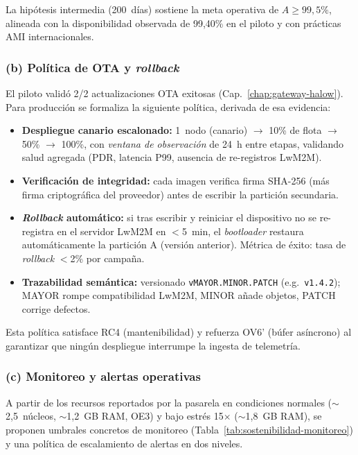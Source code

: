 La hipótesis intermedia (200~días) sostiene la meta operativa de $A \geq 99{,}5\%$, alineada con la disponibilidad observada de 99,40\% en el piloto y con prácticas AMI internacionales.

\subsubsection{(b) Política de OTA y \emph{rollback}}

El piloto validó 2/2 actualizaciones OTA exitosas (Cap.~\ref{chap:gateway-halow}). Para producción se formaliza la siguiente política, derivada de esa evidencia:

\begin{itemize}
\item \textbf{Despliegue canario escalonado:} 1~nodo (canario) $\rightarrow$ 10\% de flota $\rightarrow$ 50\% $\rightarrow$ 100\%, con \emph{ventana de observación} de 24~h entre etapas, validando salud agregada (PDR, latencia P99, ausencia de re-registros LwM2M).
\item \textbf{Verificación de integridad:} cada imagen verifica firma SHA-256 (más firma criptográfica del proveedor) antes de escribir la partición secundaria.
\item \textbf{\emph{Rollback} automático:} si tras escribir y reiniciar el dispositivo no se re-registra en el servidor LwM2M en $<$5~min, el \emph{bootloader} restaura automáticamente la partición A (versión anterior). Métrica de éxito: tasa de \emph{rollback} $<$2\% por campaña.
\item \textbf{Trazabilidad semántica:} versionado \texttt{vMAYOR.MINOR.PATCH} (e.g.\ \texttt{v1.4.2}); MAYOR rompe compatibilidad LwM2M, MINOR añade objetos, PATCH corrige defectos.
\end{itemize}

Esta política satisface RC4 (mantenibilidad) y refuerza OV6' (búfer asíncrono) al garantizar que ningún despliegue interrumpe la ingesta de telemetría.

\subsubsection{(c) Monitoreo y alertas operativas}

A partir de los recursos reportados por la pasarela en condiciones normales ($\sim$2,5~núcleos, $\sim$1,2~GB RAM, OE3) y bajo estrés 15$\times$ ($\sim$1,8~GB RAM), se proponen umbrales concretos de monitoreo (Tabla~\ref{tab:sostenibilidad-monitoreo}) y una política de escalamiento de alertas en dos niveles.

